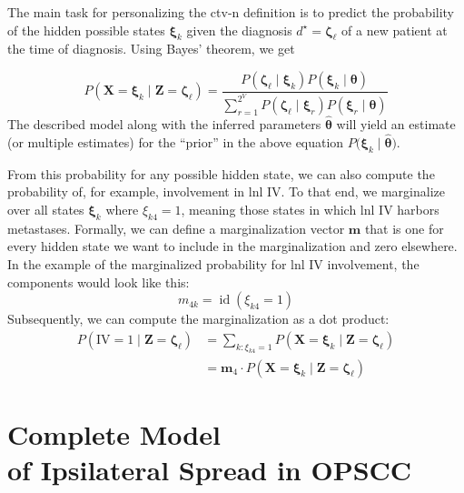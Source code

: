 \documentclass[twocolumn]{article}
\begin{document}
The main task for personalizing the \gls{ctv-n} definition is to predict the probability of the hidden possible states $\boldsymbol{\xi}_k$ given the diagnosis $d^\star=\boldsymbol{\zeta}_\ell$ of a new patient at the time of diagnosis. Using Bayes' theorem, we get

\begin{equation}
    P\left( \mathbf{X}=\boldsymbol{\xi}_k \mid \mathbf{Z}=\boldsymbol{\zeta}_\ell \right) = \frac{P\left( \boldsymbol{\zeta}_\ell \mid \boldsymbol{\xi}_k \right) P\left( \boldsymbol{\xi}_k \mid \boldsymbol{\theta} \right)}{\sum_{r=1}^{2^V} P\left( \boldsymbol{\zeta}_\ell \mid \boldsymbol{\xi}_r \right) P\left( \boldsymbol{\xi}_r \mid \boldsymbol{\theta} \right) }
\end{equation}
%
The described model along with the inferred parameters $\boldsymbol{\hat{\theta}}$ will yield an estimate (or multiple estimates) for the ``prior'' in the above equation $P\big( \boldsymbol{\xi}_k \mid \boldsymbol{\hat{\theta}} \big)$.

From this probability for any possible hidden state, we can also compute the probability of, for example, involvement in \gls{lnl} IV. To that end, we marginalize over all states $\boldsymbol{\xi}_k$ where $\xi_{k4} = 1$, meaning those states in which \gls{lnl} IV harbors metastases. Formally, we can define a marginalization vector $\mathbf{m}$ that is one for every hidden state we want to include in the marginalization and zero elsewhere. In the example of the marginalized probability for \gls{lnl} IV involvement, the components would look like this:
%
\begin{equation}
    m_{4k} = \operatorname{id}(\xi_{k4} = 1)
\end{equation}
%
Subsequently, we can compute the marginalization as a dot product:
%
\begin{equation}
    \begin{aligned}
        P\left(\text{IV} = 1 \mid \mathbf{Z}=\boldsymbol{\zeta}_\ell \right) &= \sum_{k:\xi_{k4} = 1} P\left( \mathbf{X}=\boldsymbol{\xi}_k \mid \mathbf{Z}=\boldsymbol{\zeta}_\ell \right) \\
        &= \mathbf{m}_4 \cdot P\left( \mathbf{X}=\boldsymbol{\xi}_k \mid \mathbf{Z}=\boldsymbol{\zeta}_\ell \right)
    \end{aligned}
\end{equation}


\section{Complete Model\\of Ipsilateral Spread in OPSCC}
\label{sec:complete_model}
\end{document}
